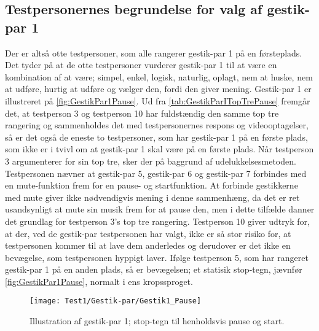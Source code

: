 \subsection{Testpersonernes begrundelse for valg af gestik-par 1}
\label{TestresultaterValgAfGestikkerBegrundelseGP1}
%
Der er altså otte testpersoner, som alle rangerer gestik-par 1 på en førsteplads. Det tyder på at de otte testpersoner vurderer gestik-par 1 til at være en kombination af at være; simpel, enkel, logisk, naturlig, oplagt, nem at huske, nem at udføre, hurtig at udføre og vælger den, fordi den giver mening. Gestik-par 1 er illustreret på \autoref{fig:GestikPar1Pause}. Ud fra \autoref{tab:GestikParITopTrePause} fremgår det, at testperson 3 og testperson 10 har fuldstændig den samme top tre rangering og sammenholdes det med testpersonernes respons og videooptagelser, så er det også de eneste to testpersoner, som har gestik-par 1 på en første plads, som ikke er i tvivl om at gestik-par 1 skal være på en første plads. Når testperson 3 argumenterer for sin top tre, sker der på baggrund af udelukkelsesmetoden. Testpersonen nævner at gestik-par 5, gestik-par 6 og gestik-par 7 forbindes med en mute-funktion frem for en pause- og startfunktion. At forbinde gestikkerne med mute giver ikke nødvendigvis mening i denne sammenhæng, da det er ret usandsynligt at mute sin musik frem for at pause den, men i dette tilfælde danner det grundlag for testperson 3's top tre rangering. Testperson 10 giver udtryk for, at der, ved de gestik-par testpersonen har valgt, ikke er så stor risiko for, at testpersonen kommer til at lave dem anderledes og derudover er det ikke en bevægelse, som testpersonen hyppigt laver. Ifølge testperson 5, som har rangeret gestik-par 1 på en anden plads, så er bevægelsen; et statisik stop-tegn, jævnfør \autoref{fig:GestikPar1Pause}, normalt i ens kropssproget.   
%
\begin{figure}[H]
	\centering
	\texttt{[image: Test1/Gestik-par/Gestik1\_Pause]}
	\caption{Illustration af gestik-par 1; stop-tegn til henholdsvis pause og start.}
	\label{fig:GestikPar1Pause}
\end{figure}
\noindent
% 	 
